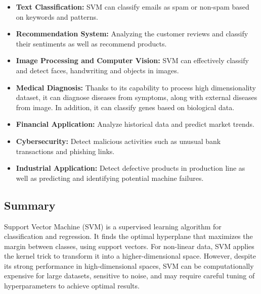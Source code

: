 \begin{itemize}
    \item \textbf{Text Classification:} SVM can classify emails as spam or non-spam based on keywords and patterns.
    \item \textbf{Recommendation System:} Analyzing the customer reviews and classify their sentiments as well as recommend products.
    \item \textbf{Image Processing and Computer Vision:} SVM can effectively classify and detect faces, handwriting and objects in images.
    \item \textbf{Medical Diagnosis:} Thanks to its capability to process high dimensionality dataset, it can diagnose diseases from symptoms, along with external diseases from image.
    In addition, it can classify genes based on biological data.
    \item \textbf{Financial Application:} Analyze historical data and predict market trends.
    \item \textbf{Cybersecurity:} Detect malicious activities such as unusual bank transactions and phishing links.
    \item \textbf{Industrial Application:} Detect defective products in production line as well as predicting and identifying potential machine failures.
\end{itemize}

\subsection{Summary}
\label{subsec:summary-svm}

Support Vector Machine (SVM) is a supervised learning algorithm for classification and regression.
It finds the optimal hyperplane that maximizes the margin between classes, using support vectors.
For non-linear data, SVM applies the kernel trick to transform it into a higher-dimensional space.
However, despite its strong performance in high-dimensional spaces, SVM can be computationally expensive for large datasets, sensitive to noise, and may require careful tuning of hyperparameters to achieve optimal results.